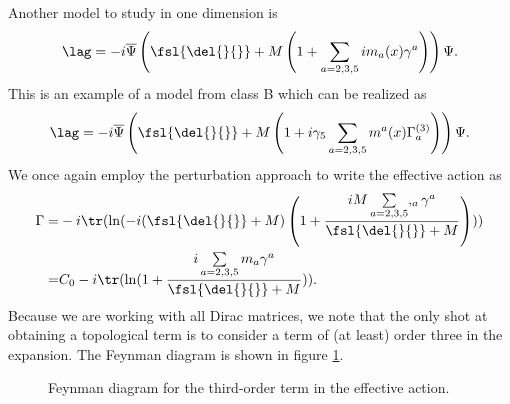 Another model to study in one dimension is
\begin{align*}
	\lag = -i\overline{\Psi}\left(\fsl{\del{}{}} + M\left(1 + \sum\limits_{a = 2, 3, 5}im_{a}(x)\gamma^{a}\right)\right)\Psi.
\end{align*}
This is an example of a model from class B which can be realized as
\begin{align*}
	\lag = -i\overline{\Psi}\left(\fsl{\del{}{}} + M\left(1 + i\gamma_{5}\sum\limits_{a = 2, 3, 5}m^{a}(x)\Gamma_{a}^{(3)}\right)\right)\Psi.
\end{align*}
We once again employ the perturbation approach to write the effective action as
\begin{align*}
	\Gamma =& -i\tr(\ln(-i(\fsl{\del{}{}} + M)\left(1 + \frac{iM\sum\limits_{a = 2, 3, 5},_{a}\gamma^{a}}{\fsl{\del{}{}} + M}\right))) \\
	       =& C_{0} - i\tr(\ln(1 + \frac{i\sum\limits_{a = 2, 3, 5}m_{a}\gamma^{a}}{\fsl{\del{}{}} + M})).
\end{align*}
Because we are working with all Dirac matrices, we note that the only shot at obtaining a topological term is to consider a term of (at least) order three in the expansion. The Feynman diagram is shown in figure \ref{fig:third_order_fd}.

\begin{figure}[!ht]
	\centering
	\caption{Feynman diagram for the third-order term in the effective action.}
	\label{fig:third_order_fd}
\end{figure}

